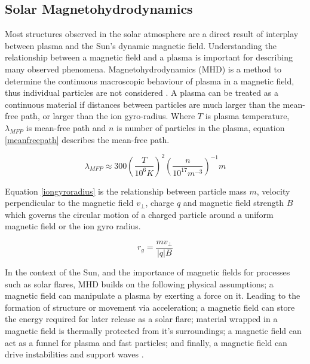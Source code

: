 


\subsection{Solar Magnetohydrodynamics}\label{MHD}
Most structures observed in the solar atmosphere are a direct result of interplay between plasma and the Sun's dynamic magnetic field. Understanding the relationship between a magnetic field and a plasma is important for describing many observed phenomena. Magnetohydrodynamics (MHD) is a method to determine the continuous macroscopic behaviour of plasma in a magnetic field, thus individual particles are not considered \citep{1982soma.book.....P}. A plasma can be treated as a continuous material if distances between particles are much larger than the mean-free path, or larger than the ion gyro-radius. Where $T$ is plasma temperature, $\lambda_{MFP}$ is mean-free path and $n$ is number of particles in the plasma, equation \ref{meanfreepath} describes the mean-free path. 

\begin{equation}\label{meanfreepath}
\lambda_{MFP}\approx300(\frac{T}{10^{6}K})^{2}(\frac{n}{10^{17}m^{-3}})^{-1}m
\end{equation}

Equation \ref{iongyroradius} is the relationship between particle mass $m$, velocity perpendicular to the magnetic field $v_{\bot}$, charge $q$ and magnetic field strength $B$  which governs the circular motion of a charged particle around a uniform magnetic field or the ion gyro radius. 

\begin{equation}\label{iongyroradius}
r_{g}=\frac{mv_{\bot}}{|q|B}
\end{equation}

In the context of the Sun, and the importance of magnetic fields for processes such as solar flares, MHD builds on the following physical assumptions; a magnetic field can manipulate a plasma by exerting a force on it. Leading to the formation of structure or movement via acceleration; a magnetic field can store the energy required for later release as a solar flare; material wrapped in a magnetic field is thermally protected from it's surroundings; a magnetic field can act as a funnel for plasma and fast particles; and finally, a magnetic field can drive instabilities and support waves \citep{2003dysu.book.....D}.

